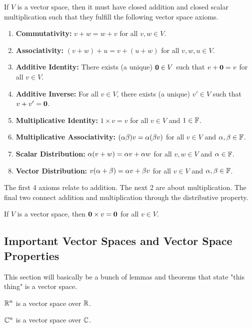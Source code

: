 \begin{thm}
    If $V$ is a vector space, then it must have closed addition and closed scalar multiplication such that they fulfill the following vector space 
    axioms.
    \begin{enumerate}
        \item \textbf{Commutativity:} $v + w = w + v$ for all $v,w \in V$.
        \item \textbf{Associativity:} $(v + w) + u = v + (u + w)$ for all $v,w,u \in V$.
        \item \textbf{Additive Identity:} There exists (a unique) $\mathbf{0} \in V$ such that $v + \mathbf{0} = v$ for all $v \in V$.
        \item \textbf{Additive Inverse:} For all $v \in V$, there exists (a unique) $v' \in V$ such that $v + v' = \mathbf{0}$.
        \item \textbf{Multiplicative Identity:} $1 \times v = v$ for all $v \in V$ and $1 \in \mathbb{F}$.
        \item \textbf{Multiplicative Associativity:} $(\alpha \beta) v = \alpha (\beta v)$ for all $v\in V$ and $\alpha, \beta \in \mathbb{F}$.
        \item \textbf{Scalar Distribution:} $\alpha (v + w) = \alpha v + \alpha w$ for all $v,w \in V$ and $\alpha \in \mathbb{F}$.
        \item \textbf{Vector Distribution:} $v (\alpha + \beta) = \alpha v + \beta v$ for all $v\in V$ and $\alpha, \beta \in \mathbb{F}$.
    \end{enumerate}
\end{thm}

\begin{remark} 
    The first 4 axioms relate to addition. The next 2 are about multiplication. The final two connect addition and multiplication through the distributive 
    property.
\end{remark}

\begin{lemma}
    If $V$ is a vector space, then $\mathbf{0} \times v = \mathbf{0}$ for all $v \in V$.
\end{lemma}

\subsection{Important Vector Spaces and Vector Space Properties}
This section will basically be a bunch of lemmas and theorems that state "this thing" is a vector space.
\begin{thm}
    $\mathbb{R}^n$ is a vector space over $\mathbb{R}$.
\end{thm}
\begin{thm}
    $\mathbb{C}^n$ is a vector space over $\mathbb{C}$.
\end{thm}

